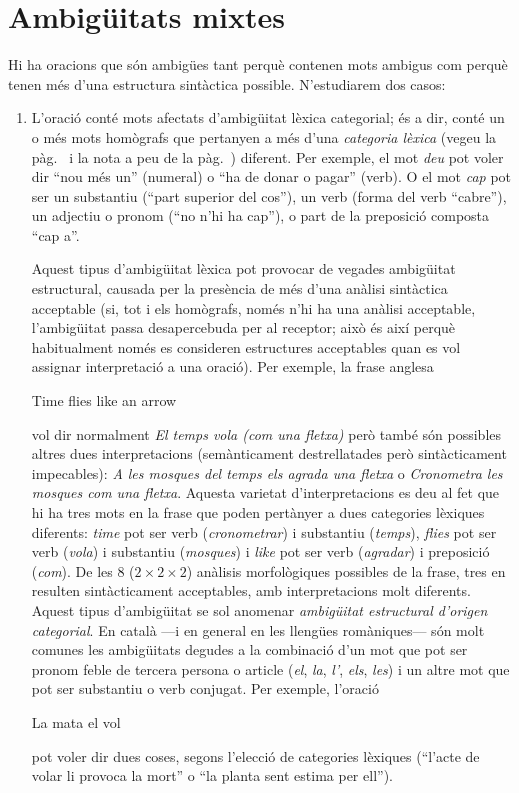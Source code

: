 \begin{enumerate}
\end{enumerate}


\section{Ambigüitats mixtes}
Hi ha oracions que són ambigües tant perquè contenen mots ambigus com
perquè tenen més d'una estructura sintàctica possible. N'estudiarem
dos casos:
\begin{enumerate}
\item L'oració conté mots afectats d'ambigüitat lèxica categorial; és
  a dir, conté un o més mots homògrafs  que pertanyen a més d'una {\em
    categoria lèxica} (vegeu la pàg.~\pageref{pg:catlex} i la nota a
  peu de la pàg.~\pageref{pg:catgra}) diferent.  Per exemple, el mot {\em
    deu} pot voler dir ``nou més un'' (numeral) o ``ha de donar o
  pagar'' (verb).  O el mot \emph{cap} pot ser un substantiu (``part
  superior del cos''), un verb (forma del verb ``cabre''), un adjectiu
  o pronom (``no n'hi ha cap''), o part de la preposició composta
  ``cap a''.
  
  Aquest tipus d'ambigüitat lèxica pot provocar de vegades ambigüitat
  estructural, causada per la presència de més d'una anàlisi
  sintàctica acceptable (si, tot i els homògrafs, només n'hi ha una
  anàlisi acceptable, l'ambigüitat passa desapercebuda per al
  receptor; això és així perquè habitualment només es consideren
  estructures acceptables quan es vol assignar interpretació a una
  oració).  Per exemple, la frase anglesa
  \begin{exemple}
  Time flies like an arrow
  \end{exemple}
  vol dir normalment \emph{El temps vola (com una fletxa)} però també
  són possibles altres dues interpretacions (semànticament
  destrellatades però sintàcticament impecables): \emph{A les mosques
    del temps els agrada una fletxa} o \emph{Cronometra les mosques
    com una fletxa}.  Aquesta varietat d'interpretacions es deu al fet
  que hi ha tres mots en la frase que poden pertànyer a dues
  categories lèxiques diferents: \emph{time} pot ser verb (\emph{cronometrar}) i
  substantiu (\emph{temps}), \emph{flies} pot ser verb (\emph{vola}) i
  substantiu (\emph{mosques}) i \emph{like}
  pot ser verb (\emph{agradar}) i preposició (\emph{com}).  De les 8 ($2\times 2\times 2$) anàlisis
  morfològiques possibles de la frase, tres en resulten sintàcticament
  acceptables, amb interpretacions molt diferents. Aquest tipus
  d'ambigüitat se sol anomenar \emph{ambigüitat estructural d'origen
    categorial}. En català ---i en general en les llengües romàniques--- són molt comunes les
  ambigüitats degudes a la combinació d'un mot que pot ser pronom
  feble de tercera persona o article (\emph{el}, \emph{la}, \emph{l'},
  \emph{els}, \emph{les}) i un altre mot que pot ser substantiu o verb
  conjugat. Per exemple, l'oració
    \begin{exemple}
    La mata el vol
    \end{exemple} 
    pot voler dir dues coses, segons l'elecció de categories
    lèxiques (``l'acte de volar li provoca la mort'' o ``la planta
    sent estima per ell'').
  

\end{enumerate}
